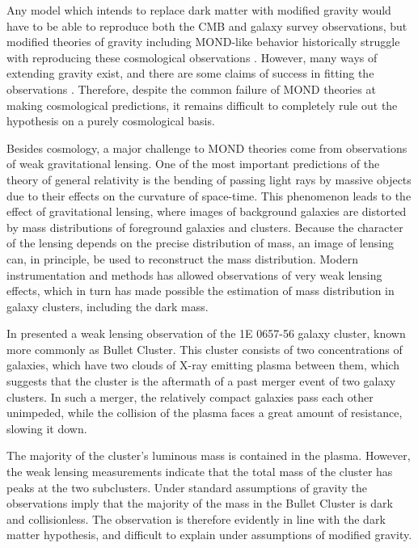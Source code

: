 \documentclass[b5paper, 10pt, twoside]{book}
\begin{document}
Any model which intends to replace dark matter with modified gravity would have to be able to reproduce both the CMB and galaxy survey observations, but modified theories of gravity including MOND-like behavior historically struggle with reproducing these cosmological observations \parencites{XuWangZhang2015, TanWoodard2018, ZlosnikSkordis2017}. However, many ways of extending gravity exist, and there are some claims of success in fitting the observations \parencite{SkordisZlosnik2021}. Therefore, despite the common failure of MOND theories at making cosmological predictions, it remains difficult to completely rule out the hypothesis on a purely cosmological basis.

Besides cosmology, a major challenge to MOND theories come from observations of weak gravitational lensing. One of the most important predictions of the theory of general relativity is the bending of passing light rays by massive objects due to their effects on the curvature of space-time. This phenomenon leads to the effect of gravitational lensing, where images of background galaxies are distorted by mass distributions of foreground galaxies and clusters. Because the character of the lensing depends on the precise distribution of mass, an image of lensing can, in principle, be used to reconstruct the mass distribution. Modern instrumentation and methods has allowed observations of very weak lensing effects, which in turn has made possible the estimation of mass distribution in galaxy clusters, including the dark mass.

In \citeyear{CloweEtAl2006} \citeauthor{CloweEtAl2006} presented a weak lensing observation of the 1E 0657-56 galaxy cluster, known more commonly as Bullet Cluster. This cluster consists of two concentrations of galaxies, which have two clouds of X-ray emitting plasma between them, which suggests that the cluster is the aftermath of a past merger event of two galaxy clusters. In such a merger, the relatively compact galaxies pass each other unimpeded, while the collision of the plasma faces a great amount of resistance, slowing it down.

The majority of the cluster's luminous mass is contained in the plasma. However, the weak lensing measurements indicate that the total mass of the cluster has peaks at the two subclusters. Under standard assumptions of gravity the observations imply that the majority of the mass in the Bullet Cluster is dark and collisionless. The observation is therefore evidently in line with the dark matter hypothesis, and difficult to explain under assumptions of modified gravity.
\end{document}
